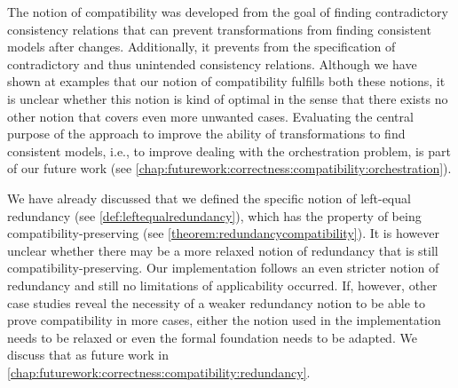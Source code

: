 The notion of compatibility was developed from the goal of finding contradictory consistency relations that can prevent transformations from finding consistent models after changes.
Additionally, it prevents from the specification of contradictory and thus unintended consistency relations.
Although we have shown at examples that our notion of compatibility fulfills both these notions, it is unclear whether this notion is kind of optimal in the sense that there exists no other notion that covers even more unwanted cases.
Evaluating the central purpose of the approach to improve the ability of transformations to find consistent models, i.e., to improve dealing with the orchestration problem, is part of our future work (see \autoref{chap:futurework:correctness:compatibility:orchestration}).

We have already discussed that we defined the specific notion of left-equal redundancy (see \autoref{def:leftequalredundancy}), which has the property of being compatibility-preserving (see \autoref{theorem:redundancycompatibility}).
It is however unclear whether there may be a more relaxed notion of redundancy that is still compatibility-preserving.
Our implementation follows an even stricter notion of redundancy and still no limitations of applicability occurred.
If, however, other case studies reveal the necessity of a weaker redundancy notion to be able to prove compatibility in more cases, either the notion used in the implementation needs to be relaxed or even the formal foundation needs to be adapted.
We discuss that as future work in \autoref{chap:futurework:correctness:compatibility:redundancy}.


